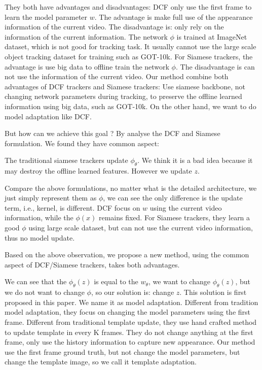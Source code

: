 \documentclass[journal]{IEEEtran}
\begin{document}
They both have advantages and disadvantages: DCF only use the first frame to learn the model parameter $w$. The advantage is make full use of the appearance information of the current video. The disadvantage is: only rely on the information of the current information. The network $\phi$ is trained at ImageNet dataset, which is not good for tracking task. It usually cannot use the large scale object tracking dataset for training such as GOT-10k.
For Siamese trackers, the advantage is use big data to offline train the network $\phi$. The disadvantage is can not use the information of the current video.
Our method combine both advantages of DCF trackers and Siamese trackers: Use siamese backbone, not changing network parameters during tracking, to preserve the offline learned information using big data, such as GOT-10k. On the other hand, we want to do model adaptation like DCF.

But how can we achieve this goal ? By analyse the DCF and Siamese formulation. We found they have common aspect:

The traditional siamese trackers update $\phi_\theta$. We think it is a bad idea because it may destroy the offline learned features. However we update $z$.

Compare the above formulations, no matter what is the detailed architecture, we just simply represent them as $\phi$, we can see the only difference is the update term, i.e., kernel, is different. DCF focus on $w$ using the current video information, while the $\phi(x)$ remains fixed. For Siamese trackers, they learn a good $\phi$ using large scale dataset, but can not use the current video information, thus no model update.

Based on the above observation, we propose a new method, using the common aspect of DCF/Siamese trackers, takes both advantages.

We can see that the $\phi_\theta(z)$ is equal to the $w_\theta$, we want to change $\phi_\theta(z)$, but we do not want to change $\phi$, so our solution is: change $z$. This solution is first proposed in this paper. We name it as model adaptation. Different from tradition model adaptation, they focus on changing the model parameters using the first frame. Different from traditional template update, they use hand crafted method to update template in every K frames. They do not change anything at the first frame, only use the history information to capture new appearance. Our method use the first frame ground truth, but not change the model parameters, but change the template image, so we call it template adaptation.
\end{document}
